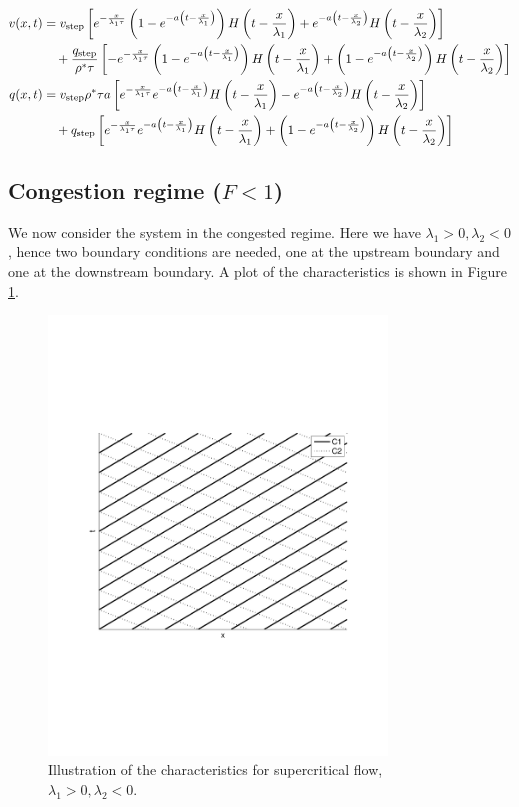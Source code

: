 \documentclass[preprint]{elsarticle}
\begin{document}
\begin{align} 
v(x,t) &= v_{\text{step}}\left[e^{-\frac{x}{\lambda_1\tau}}\left(1 - e^{-a\left(t-\frac{x}{\lambda_1}\right)}\right)H\left(t-\frac{x}{\lambda_1}\right) + e^{-a\left(t-\frac{x}{\lambda_2}\right)}H\left(t-\frac{x}{\lambda_2}\right)\right] \notag \\
&\quad+ \dfrac{q_{\text{step}}}{\rho^* \tau}\left[- e^{-\frac{x}{\lambda_1\tau}}\left(1 - e^{-a\left(t-\frac{x}{\lambda_1}\right)}\right)H\left(t-\frac{x}{\lambda_1}\right) + \left(1 - e^{-a\left(t-\frac{x}{\lambda_2}\right)}\right)H\left(t-\frac{x}{\lambda_2}\right) \right] \\
q(x,t) &= v_{\text{step}}\rho^*\tau a\left[e^{-\frac{x}{\lambda_1\tau}}e^{-a\left(t-\frac{x}{\lambda_1}\right)}H\left(t-\frac{x}{\lambda_1}\right) - e^{-a\left(t-\frac{x}{\lambda_2}\right)}H\left(t-\frac{x}{\lambda_2}\right) \right] \notag \\
&\quad+ q_{\text{step}}\left[ e^{-\frac{x}{\lambda_1\tau}}e^{-a\left(t-\frac{x}{\lambda_1}\right)}H\left(t-\frac{x}{\lambda_1}\right) + \left(1 - e^{-a\left(t-\frac{x}{\lambda_2}\right)}\right)H\left(t-\frac{x}{\lambda_2}\right)\right]
\end{align}


\subsection{Congestion regime ($F<1$)}
We now consider the system in the congested regime. Here we have $\lambda_1 > 0, \lambda_2 < 0$, hence two boundary conditions are needed, one at the upstream boundary and one at the downstream boundary. A plot of the characteristics is shown in Figure \ref{fig:subcr}. \\

\begin{figure}[H] 
\centering
\includegraphics[trim= 0mm 75mm 0mm 70mm, width = 90mm]{subcr}
\caption{Illustration of the characteristics for supercritical flow, $\lambda_1 > 0, \lambda_2 < 0$.}
\label{fig:subcr}
\end{figure}
\end{document}
